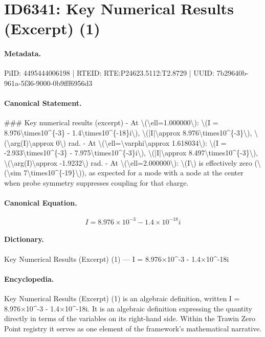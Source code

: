\section*{ID6341: Key Numerical Results (Excerpt) (1)}
\paragraph{Metadata.}
PiID: 4495444006198 | RTEID: RTE:P24623.5112:T2.8729 | UUID: 7b29640b-961a-5f36-9000-0b9fff6956d3

\paragraph{Canonical Statement.}
\#\#\# Key numerical results (excerpt) - At \textbackslash{}(\textbackslash{}ell=1.000000\textbackslash{}): \textbackslash{}(I = 8.976\textbackslash{}times10\textasciicircum{}\{-3\} - 1.4\textbackslash{}times10\textasciicircum{}\{-18\}i\textbackslash{}), \textbackslash{}(|I|\textbackslash{}approx 8.976\textbackslash{}times10\textasciicircum{}\{-3\}\textbackslash{}), \textbackslash{}(\textbackslash{}arg(I)\textbackslash{}approx 0\textbackslash{}) rad. - At \textbackslash{}(\textbackslash{}ell=\textbackslash{}varphi\textbackslash{}approx 1.618034\textbackslash{}): \textbackslash{}(I = -2.933\textbackslash{}times10\textasciicircum{}\{-3\} - 7.975\textbackslash{}times10\textasciicircum{}\{-3\}i\textbackslash{}), \textbackslash{}(|I|\textbackslash{}approx 8.497\textbackslash{}times10\textasciicircum{}\{-3\}\textbackslash{}), \textbackslash{}(\textbackslash{}arg(I)\textbackslash{}approx -1.9232\textbackslash{}) rad. - At \textbackslash{}(\textbackslash{}ell=2.000000\textbackslash{}): \textbackslash{}(I\textbackslash{}) is effectively zero (\textbackslash{}(\textbackslash{}sim 7\textbackslash{}times10\textasciicircum{}\{-19\}\textbackslash{})), as expected for a mode with a node at the center when probe symmetry suppresses coupling for that charge.

\paragraph{Canonical Equation.}
\[
I = 8.976\times10^{-3} - 1.4\times10^{-18}i
\]

\paragraph{Dictionary.}
Key Numerical Results (Excerpt) (1) — I = 8.976×10\textasciicircum{}-3 - 1.4×10\textasciicircum{}-18i

\paragraph{Encyclopedia.}
Key Numerical Results (Excerpt) (1) is an algebraic definition, written I = 8.976×10\textasciicircum{}-3 - 1.4×10\textasciicircum{}-18i. It is an algebraic definition expressing the quantity directly in terms of the variables on its right-hand side. Within the Trawin Zero Point registry it serves as one element of the framework's mathematical narrative.

